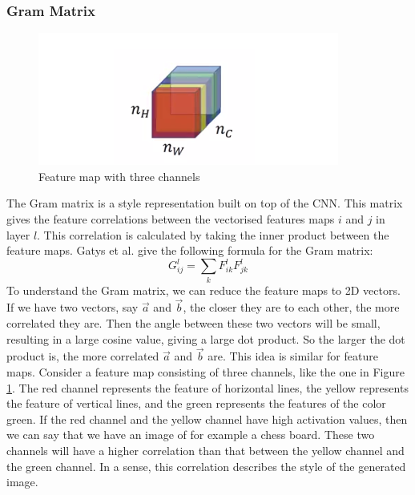 \subsubsection{Gram Matrix}
\label{section:gram}
\begin{figure}[!ht]
\begin{center}
\includegraphics[scale=0.30]{report/Background/images/featuremap.png}
\caption{Feature map with three channels}
\label{fig:featuremap}
\end{center}
\end{figure}
The Gram matrix is a style representation built on top of the CNN. This matrix gives the feature correlations between the vectorised features maps $i$ and $j$ in layer $l$. This correlation is calculated by taking the inner product between the feature maps. Gatys et al. give the following formula for the Gram matrix:
\begin{equation}
    G_{ij}^l=\sum_k{F_{ik}^lF_{jk}^l}
\end{equation}
To understand the Gram matrix, we can reduce the feature maps to 2D vectors. If we have two vectors, say $\vec{a}$ and $\vec{b}$, the closer they are to each other, the more correlated they are. Then the angle between these two vectors will be small, resulting in a large cosine value, giving a large dot product. So the larger the dot product is, the more correlated $\vec{a}$ and $\vec{b}$ are. 
This idea is similar for feature maps. Consider a feature map consisting of three channels, like the one in Figure \ref{fig:featuremap}. The red channel represents the feature of horizontal lines, the yellow represents the feature of vertical lines, and the green represents the features of the color green. If the red channel and the yellow channel have high activation values, then we can say that we have an image of for example a chess board. These two channels will have a higher correlation than that between the yellow channel and the green channel. In a sense, this correlation describes the style of the generated image.
